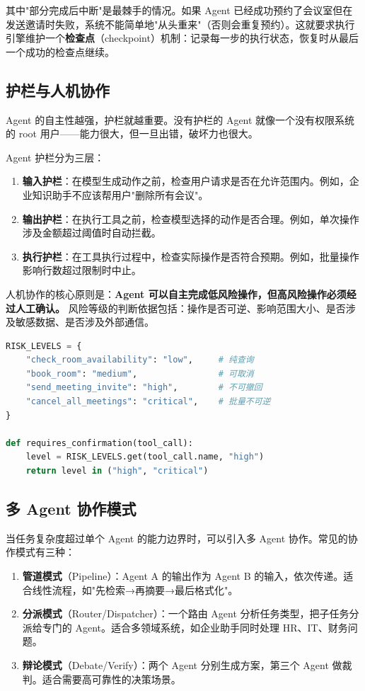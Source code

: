 其中"部分完成后中断"是最棘手的情况。如果 Agent 已经成功预约了会议室但在发送邀请时失败，系统不能简单地"从头重来"（否则会重复预约）。这就要求执行引擎维护一个\textbf{检查点}（checkpoint）机制：记录每一步的执行状态，恢复时从最后一个成功的检查点继续。

\subsection{护栏与人机协作}
Agent 的自主性越强，护栏就越重要。没有护栏的 Agent 就像一个没有权限系统的 root 用户——能力很大，但一旦出错，破坏力也很大。

Agent 护栏分为三层：

\begin{enumerate}
  \item \textbf{输入护栏}：在模型生成动作之前，检查用户请求是否在允许范围内。例如，企业知识助手不应该帮用户"删除所有会议"。
  \item \textbf{输出护栏}：在执行工具之前，检查模型选择的动作是否合理。例如，单次操作涉及金额超过阈值时自动拦截。
  \item \textbf{执行护栏}：在工具执行过程中，检查实际操作是否符合预期。例如，批量操作影响行数超过限制时中止。
\end{enumerate}

人机协作的核心原则是：\textbf{Agent 可以自主完成低风险操作，但高风险操作必须经过人工确认。} 风险等级的判断依据包括：操作是否可逆、影响范围大小、是否涉及敏感数据、是否涉及外部通信。

\begin{lstlisting}[language=Python]
RISK_LEVELS = {
    "check_room_availability": "low",     # 纯查询
    "book_room": "medium",                # 可取消
    "send_meeting_invite": "high",        # 不可撤回
    "cancel_all_meetings": "critical",    # 批量不可逆
}

def requires_confirmation(tool_call):
    level = RISK_LEVELS.get(tool_call.name, "high")
    return level in ("high", "critical")
\end{lstlisting}

\subsection{多 Agent 协作模式}
当任务复杂度超过单个 Agent 的能力边界时，可以引入多 Agent 协作。常见的协作模式有三种：

\begin{enumerate}
  \item \textbf{管道模式}（Pipeline）：Agent A 的输出作为 Agent B 的输入，依次传递。适合线性流程，如"先检索→再摘要→最后格式化"。
  \item \textbf{分派模式}（Router/Dispatcher）：一个路由 Agent 分析任务类型，把子任务分派给专门的 Agent。适合多领域系统，如企业助手同时处理 HR、IT、财务问题。
  \item \textbf{辩论模式}（Debate/Verify）：两个 Agent 分别生成方案，第三个 Agent 做裁判。适合需要高可靠性的决策场景。
\end{enumerate}

